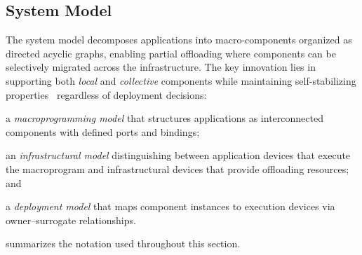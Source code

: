 \subsection{System Model}\label{sec:system-model}
The system model decomposes applications 
 into macro-components organized as directed acyclic graphs,
 enabling partial offloading where components can be selectively migrated across the infrastructure.
%
The key innovation lies in supporting both \emph{local} and \emph{collective} components 
 while maintaining self-stabilizing properties~\cite{DBLP:journals/tomacs/ViroliABDP18} 
 regardless of deployment decisions:
%
\begin{enumerate*}[label=(\arabic*)]
  \item a \emph{macroprogramming model} that structures applications as
   interconnected components with defined ports and bindings;
  \item an \emph{infrastructural model} distinguishing between application devices 
   that execute the macroprogram and infrastructural devices that provide offloading resources; and
  \item a \emph{deployment model} that maps component instances to execution devices via owner--surrogate relationships.
\end{enumerate*}

 summarizes the notation used throughout this section.

